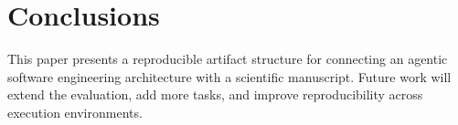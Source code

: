 \section{Conclusions}

This paper presents a reproducible artifact structure for connecting an agentic
software engineering architecture with a scientific manuscript. Future work will
extend the evaluation, add more tasks, and improve reproducibility across
execution environments.
